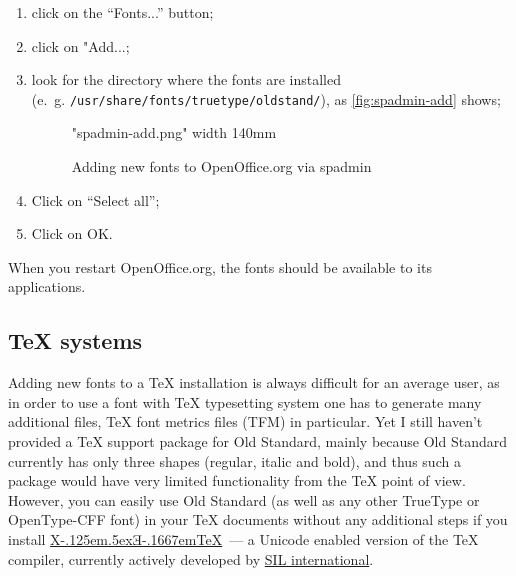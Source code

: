 \documentclass[12pt,a4paper,openany]{book}
\providecommand{\XeTeX}{X\kern-.125em\lower.5ex\hbox{Ǝ}\kern-.1667em\TeX}
\begin{document}
\begin{enumerate}

\item click on the “Fonts...” button;

\item click on "Add...;

\item look for the directory where the fonts are installed\\ (e.~g.
\texttt{/usr/share/fonts/truetype/oldstand/}), as \autoref{fig:spadmin-add}
shows;

\begin{figure}[htb]

\centerline{\XeTeXpicfile "spadmin-add.png" width 140mm}

\caption{Adding new fonts to OpenOffice.org via spadmin}

\hypertarget{fig:spadmin-add}{}\label{fig:spadmin-add}

\end{figure}

\item Click on “Select all”;

\item Click on OK.

\end{enumerate}

When you restart OpenOffice.org, the fonts should be available to its
applications.

\subsection{TeX systems}

Adding new fonts to a \TeX{} installation is always difficult for an
average user, as in order to use a font with \TeX{} typesetting system one
has to generate many additional files, \TeX{} font metrics files (TFM) in
particular. Yet I still haven’t provided a \TeX{} support package for Old
Standard, mainly because Old Standard currently has only three shapes
(regular, italic and bold), and thus such a package would have very limited
functionality from the \TeX{} point of view. However, you can easily use
Old Standard (as well as any other TrueType or OpenType-CFF font) in your
\TeX{} documents without any additional steps if you install
\href{http://scripts.sil.org/xetex}{\XeTeX}~— a Unicode enabled version of
the \TeX{} compiler, currently actively developed by
\href{http://www.sil.org}{SIL international}.
\end{document}
